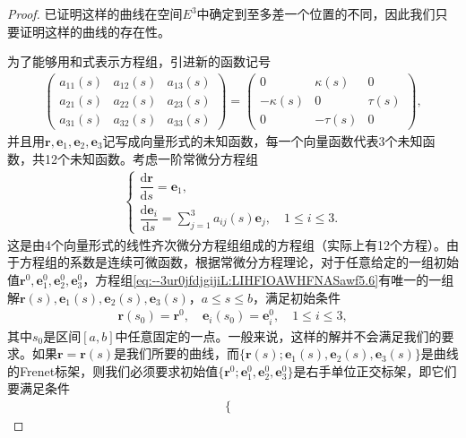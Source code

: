 \documentclass[../../main.tex]{subfiles}%
\begin{document}
\begin{proof}

已证明这样的曲线在空间$E^3$中确定到至多差一个位置的不同，因此我们只要证明这样的曲线的存在性。

为了能够用和式表示方程组，引进新的函数记号
\begin{align}
\begin{pmatrix}
a_{11}(s) & a_{12}(s) & a_{13}(s) \\
a_{21}(s) & a_{22}(s) & a_{23}(s) \\
a_{31}(s) & a_{32}(s) & a_{33}(s)
\end{pmatrix}
=
\begin{pmatrix}
0 & \kappa(s) & 0 \\
-\kappa(s) & 0 & \tau(s) \\
0 & -\tau(s) & 0
\end{pmatrix},
\label{eq:--3ur0jfdjgijiL:LIHFIOAWHFNASawf5.5}
\end{align}
并且用$\bm{r},\bm{e}_1,\bm{e}_2,\bm{e}_3$记写成向量形式的未知函数，每一个向量函数代表3个未知函数，共12个未知函数。考虑一阶常微分方程组
\begin{align}
\begin{cases}
\dfrac{\mathrm{d}\bm{r}}{\mathrm{d}s} = \bm{e}_1, \\
\dfrac{\mathrm{d}\bm{e}_i}{\mathrm{d}s} = \sum\limits_{j=1}^3 a_{ij}(s)\bm{e}_j,\quad 1 \leqslant i \leqslant 3.
\end{cases}
\label{eq:--3ur0jfdjgijiL:LIHFIOAWHFNASawf5.6}
\end{align}
这是由4个向量形式的线性齐次微分方程组组成的方程组（实际上有12个方程）。由于方程组的系数是连续可微函数，根据常微分方程理论，对于任意给定的一组初始值$\bm{r}^0,\bm{e}_1^0,\bm{e}_2^0,\bm{e}_3^0$，方程组\eqref{eq:--3ur0jfdjgijiL:LIHFIOAWHFNASawf5.6}有唯一的一组解$\bm{r}(s),\bm{e}_1(s),\bm{e}_2(s),\bm{e}_3(s)$，$a \leqslant s \leqslant b$，满足初始条件
\begin{align}
\bm{r}(s_0) = \bm{r}^0,\quad \bm{e}_i(s_0) = \bm{e}_i^0,\quad 1 \leqslant i \leqslant 3,
\label{eq:--3ur0jfdjgijiL:LIHFIOAWHFNASawf5.7}
\end{align}
其中$s_0$是区间$[a,b]$中任意固定的一点。一般来说，这样的解并不会满足我们的要求。如果$\bm{r} = \bm{r}(s)$是我们所要的曲线，而$\{\bm{r}(s);\bm{e}_1(s),\bm{e}_2(s),\bm{e}_3(s)\}$是曲线的Frenet标架，则我们必须要求初始值$\{\bm{r}^0;\bm{e}_1^0,\bm{e}_2^0,\bm{e}_3^0\}$是右手单位正交标架，即它们要满足条件
\begin{align}
\begin{cases}

\end{cases}
\end{align}
\end{proof}
\end{document}
